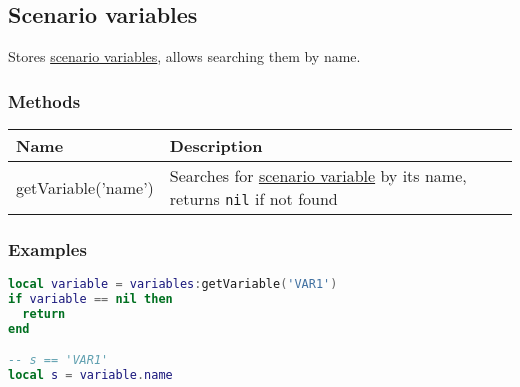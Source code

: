 \subsection{Scenario variables}
\label{ScenarioVariables}
Stores \hyperref[ScenarioVariable]{scenario variables}, allows searching them by name.
\subsubsection{Methods}
\begin{center}
\begin{tabularx}{\linewidth}{| l | X |}
\hline
\textbf{Name} & \textbf{Description} \\
\hline
getVariable('name') & Searches for \hyperref[ScenarioVariable]{scenario variable} by its name, returns \texttt{nil} if not found\\
\hline
\end{tabularx}
\end{center}
\subsubsection{Examples}
\begin{center}
\begin{lstlisting}[language=Lua]
local variable = variables:getVariable('VAR1')
if variable == nil then
  return
end

-- s == 'VAR1'
local s = variable.name
\end{lstlisting}
\end{center}